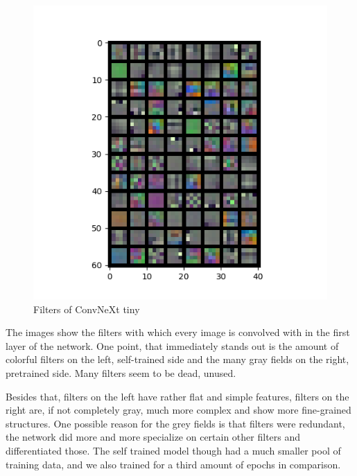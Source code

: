 \documentclass{article}
\begin{document}
\begin{figure}[h]
\begin{minipage}[b]{0.49\textwidth}
        \includegraphics[width=\textwidth]{images/filters_layer0_pretrained}
        \caption{Filters of ConvNeXt tiny}
    \end{minipage}\label{fig:filters}
\end{figure}

The images show the filters with which every image is convolved with in the first layer of the network.
One point, that immediately stands out is the amount of colorful filters on the left, self-trained side and the many gray fields on the right, pretrained side.
Many filters seem to be dead, unused.

Besides that, filters on the left have rather flat and simple features, filters on the right are, if not completely gray, much more complex and show more fine-grained structures.
One possible reason for the grey fields is that filters were redundant, the network did more and more specialize on certain other filters and differentiated those.
The self trained model though had a much smaller pool of training data, and we also trained for a third amount of epochs in comparison.
\end{document}
